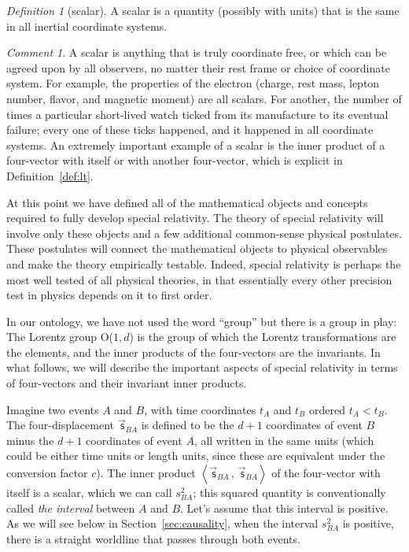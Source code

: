 \documentclass[10pt]{article}
\newcounter{par}
\renewcommand{\paragraph}[1]{\addvspace{2.5ex}\par\refstepcounter{par}\noindent{\textbf{\thepar.~{#1}}~---}}
\newcommand{\secref}[1]{Section~\ref{#1}}
\theoremstyle{remark}
\newtheorem{definition}{Definition}
\newcommand{\defref}[1]{Definition~\ref{#1}}
\theoremstyle{remark}
\newtheorem*{remark}{Comment}
\newcommand\upvec[1]{\!\vec{\,\mathrm{#1}}}
\newcommand{\fv}[1]{\upvec{\mathsf{#1}}} %
\newcommand{\inner}[2]{\left<{#1}\,,\,{#2}\right>}
\begin{document}
\begin{definition}[scalar]
    A scalar is a quantity (possibly with units) that is the same in all inertial coordinate systems.
\end{definition}
\begin{remark}
    A scalar is anything that is truly coordinate free, or which can be agreed upon by all observers, no matter their rest frame or choice of coordinate system.
    For example, the properties of the electron (charge, rest mass, lepton number, flavor, and magnetic moment) are all scalars.
    For another, the number of times a particular short-lived watch ticked from its manufacture to its eventual failure; every one of these ticks happened, and it happened in all coordinate systems.
    An extremely important example of a scalar is the inner product of a four-vector with itself or with another four-vector, which is explicit in \defref{def:lt}.
\end{remark}

At this point we have defined all of the mathematical objects and concepts required to fully develop special relativity.
The theory of special relativity will involve only these objects and a few additional common-sense physical postulates.
These postulates will connect the mathematical objects to physical observables and make the theory empirically testable.
Indeed, special relativity is perhaps the most well tested of all physical theories, in that essentially every other precision test in physics depends on it to first order.

In our ontology, we have not used the word ``group'' but there is a group in play:
The Lorentz group O($1,d$) is the group of which the Lorentz transformations are the elements, and the inner products of the four-vectors are the invariants.
In what follows, we will describe the important aspects of special relativity in terms of four-vectors and their invariant inner products.

\paragraph{Time dilation and length contraction}\label{sec:time}
Imagine two events $A$ and $B$, with time coordinates $t_A$ and $t_B$ ordered $t_A<t_B$.
The four-displacement $\fv{s}_{BA}$ is defined to be the $d+1$ coordinates of event $B$ minus the $d+1$ coordinates of event $A$, all written in the same units (which could be either time units or length units, since these are equivalent under the conversion factor $c$).
The inner product $\inner{\fv{s}_{BA}}{\fv{s}_{BA}}$ of the four-vector with itself is a scalar, which we can call $s^2_{BA}$; this squared quantity is conventionally called \emph{the interval} between $A$ and $B$.
Let's assume that this interval is positive.
As we will see below in \secref{sec:causality}, when the interval $s^2_{BA}$ is positive, there is a straight worldline that passes through both events.
\end{document}

